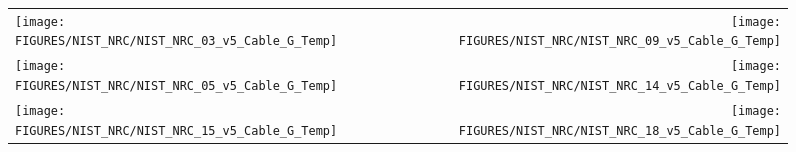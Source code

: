 \begin{figure}[h!]
\begin{tabular*}{\textwidth}{l@{\extracolsep{\fill}}r}
\texttt{[image: FIGURES/NIST\_NRC/NIST\_NRC\_03\_v5\_Cable\_G\_Temp]} &
\texttt{[image: FIGURES/NIST\_NRC/NIST\_NRC\_09\_v5\_Cable\_G\_Temp]} \\
\texttt{[image: FIGURES/NIST\_NRC/NIST\_NRC\_05\_v5\_Cable\_G\_Temp]} &
\texttt{[image: FIGURES/NIST\_NRC/NIST\_NRC\_14\_v5\_Cable\_G\_Temp]} \\
\texttt{[image: FIGURES/NIST\_NRC/NIST\_NRC\_15\_v5\_Cable\_G\_Temp]} &
\texttt{[image: FIGURES/NIST\_NRC/NIST\_NRC\_18\_v5\_Cable\_G\_Temp]}
\end{tabular*}
\label{NIST_NRC_Cable_G_Open}
\end{figure}




